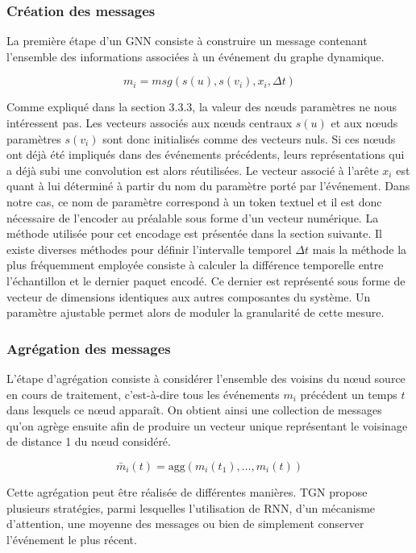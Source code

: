 \documentclass[a4paper,11pt,twoside]{StyleThese}
\begin{document}
\subsubsection{Création des messages}
La première étape d'un GNN consiste à construire un message contenant l’ensemble des informations associées à un événement du graphe dynamique. 

\[
m_i =  msg\left( s(u), s(v_i), x_i, \Delta t \right)
\]

Comme expliqué dans la section 3.3.3, la valeur des nœuds paramètres ne nous intéressent pas. Les vecteurs associés aux nœuds centraux \( s(u) \) et aux nœuds paramètres \( s(v_i) \) sont donc initialisés comme des vecteurs nuls. Si ces nœuds ont déjà été impliqués dans des événements précédents, leurs représentations qui a déjà subi une convolution est alors réutilisées. Le vecteur associé à l’arête \( x_i \) est quant à lui déterminé à partir du nom du paramètre porté par l’événement. Dans notre cas, ce nom de paramètre correspond à un token textuel et il est donc nécessaire de l’encoder au préalable sous forme d’un vecteur numérique. La méthode utilisée pour cet encodage est présentée dans la section suivante. Il existe diverses méthodes pour définir l'intervalle temporel \( \Delta t \) mais la méthode la plus fréquemment employée consiste à calculer la différence temporelle entre l'échantillon et le dernier paquet encodé. Ce dernier est représenté sous forme de vecteur de dimensions identiques aux autres composantes du système. Un paramètre ajustable permet alors de moduler la granularité de cette mesure.

\subsubsection{Agrégation des messages}
L’étape d’agrégation consiste à considérer l’ensemble des voisins du nœud source en cours de traitement, c’est-à-dire tous les événements \( m_i \) précédent un temps \( t \) dans lesquels ce nœud apparaît. On obtient ainsi une collection de messages qu'on agrège ensuite afin de produire un vecteur unique représentant le voisinage de distance 1 du nœud considéré.

$$
\bar{m}_i(t) = \text{agg} \left( m_i(t_1), \dots, m_i(t) \right)
$$

Cette agrégation peut être réalisée de différentes manières. TGN \cite{tgn} propose plusieurs stratégies, parmi lesquelles l’utilisation de RNN, d’un mécanisme d’attention, une moyenne des messages ou bien de simplement conserver l’événement le plus récent.
\end{document}
